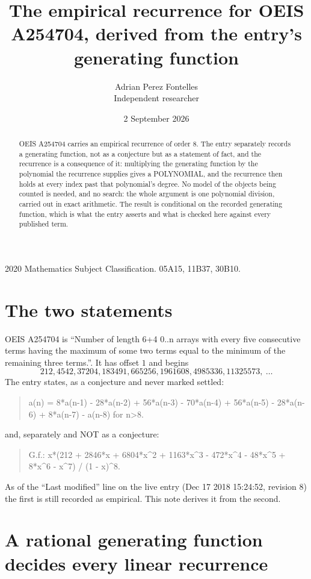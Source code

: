 \documentclass[11pt,a4paper]{article}
\title{The empirical recurrence for OEIS A254704, derived from the entry's generating function}
\author{Adrian Perez Fontelles\\ \small Independent researcher}
\date{2 September 2026}
\theoremstyle{plain}
\theoremstyle{definition}
\begin{document}
\maketitle

\begin{abstract}
OEIS A254704 carries an empirical recurrence of order $8$. The entry separately records a
generating function, not as a conjecture but as a statement of fact, and the recurrence is a
consequence of it: multiplying the generating function by the polynomial the recurrence
supplies gives a POLYNOMIAL, and the recurrence then holds at every index past that
polynomial's degree. No model of the objects being counted is needed, and no search: the
whole argument is one polynomial division, carried out in exact arithmetic. The result is
conditional on the recorded generating function, which is what the entry asserts and what is
checked here against every published term.
\end{abstract}

\noindent\small 2020 Mathematics Subject Classification. 05A15, 11B37, 30B10.\normalsize

\section{The two statements}

OEIS A254704 is ``Number of length 6+4 0..n arrays with every five consecutive terms having the maximum of some two terms equal to the minimum of the remaining three terms.''. It has offset $1$ and begins
\[
212, 4542, 37204, 183491, 665256, 1961608, 4985336, 11325573,\ \dots
\]
The entry states, as a conjecture and never marked settled:
\begin{quote}
a(n) = 8*a(n-1) - 28*a(n-2) + 56*a(n-3) - 70*a(n-4) + 56*a(n-5) - 28*a(n-6) + 8*a(n-7) - a(n-8) for n>8.
\end{quote}
and, separately and NOT as a conjecture:
\begin{quote}
G.f.: x*(212 + 2846*x + 6804*x\^{}2 + 1163*x\^{}3 - 472*x\^{}4 - 48*x\^{}5 + 8*x\^{}6 - x\^{}7) / (1 - x)\^{}8.
\end{quote}
As of the ``Last modified'' line on the live entry (Dec 17 2018 15:24:52, revision 8) the first is still
recorded as empirical. This note derives it from the second.

\section{A rational generating function decides every linear recurrence}
\end{document}
